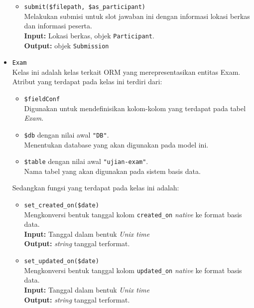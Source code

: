 \begin{itemize}
\begin{itemize}
                \item \texttt{submit(\$filepath, \$as\_participant)} \\
                    Melakukan submisi untuk slot jawaban ini dengan informasi
                    lokasi berkas dan informasi peserta. \\
                    \textbf{Input:} Lokasi berkas, objek \texttt{Participant}.\\
                    \textbf{Output:} objek \texttt{Submission}
                    
            \end{itemize}
            
        \item \texttt{Exam} \\
            Kelas ini adalah kelas terkait ORM yang merepresentasikan entitas
            Exam. Atribut yang terdapat pada kelas ini terdiri dari:
            \begin{itemize}
                \item \texttt{\$fieldConf} \\
                    Digunakan untuk mendefinisikan kolom-kolom yang terdapat
                    pada tabel \textit{Exam}.
                \item \texttt{\$db} dengan nilai awal \texttt{"DB"}. \\
                    Menentukan database yang akan digunakan pada model ini.
                \item \texttt{\$table} dengan nilai awal \texttt{"ujian-exam"}.
                \\
                    Nama tabel yang akan digunakan pada sistem basis data. 
            \end{itemize}
            Sedangkan fungsi yang terdapat pada kelas ini adalah:
            \begin{itemize}
                \item \texttt{set\_created\_on(\$date)} \\
                    Mengkonversi bentuk tanggal kolom \texttt{created\_on}
                    \textit{native} ke format basis data. \\
                    \textbf{Input:} Tanggal dalam bentuk \textit{Unix time}\\
                    \textbf{Output:} \textit{string} tanggal terformat.
                
                \item \texttt{set\_updated\_on(\$date)} \\
                    Mengkonversi bentuk tanggal kolom \texttt{updated\_on}
                    \textit{native} ke format basis data. \\
                    \textbf{Input:} Tanggal dalam bentuk \textit{Unix time}\\
                    \textbf{Output:} \textit{string} tanggal terformat.
                    

\end{itemize}
\end{itemize}
